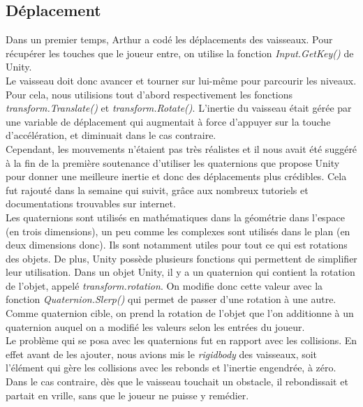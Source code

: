 \documentclass[12pt, titlepage]{article}
\begin{document}
\begin{spacing}{1.5}
\subsection{Déplacement}

Dans un premier temps, Arthur a codé les déplacements des vaisseaux. Pour récupérer les touches que le joueur entre, on utilise la fonction \textit{Input.GetKey()} de Unity.\\

Le vaisseau doit donc avancer et tourner sur lui-même pour parcourir les niveaux. Pour cela, nous utilisions tout d'abord respectivement les fonctions \textit{transform.Translate()} et \textit{transform.Rotate()}. L'inertie du vaisseau était gérée par une variable de déplacement qui augmentait à force d'appuyer sur la touche d'accélération, et diminuait dans le cas contraire.\\

Cependant, les mouvements n'étaient pas très réalistes et il nous avait été suggéré à la fin de la première soutenance d'utiliser les quaternions que propose Unity pour donner une meilleure inertie et donc des déplacements plus crédibles. Cela fut rajouté dans la semaine qui suivit, grâce aux nombreux tutoriels et documentations trouvables sur internet.\\

Les quaternions sont utilisés en mathématiques dans la géométrie dans l'espace (en trois dimensions), un peu comme les complexes sont utilisés dans le plan (en deux dimensions donc). Ils sont notamment utiles pour tout ce qui est rotations des objets. De plus, Unity possède plusieurs fonctions qui permettent de simplifier leur utilisation. Dans un objet Unity, il y a un quaternion qui contient la rotation de l'objet, appelé \textit{transform.rotation}. On modifie donc cette valeur avec la fonction \textit{Quaternion.Slerp()} qui permet de passer d'une rotation à une autre. Comme quaternion cible, on prend la rotation de l'objet que l'on additionne à un quaternion auquel on a modifié les valeurs selon les entrées du joueur.\\

Le problème qui se posa avec les quaternions fut en rapport avec les collisions. En effet avant de les ajouter, nous avions mis le \textit{rigidbody} des vaisseaux, soit l'élément qui gère les collisions avec les rebonds et l'inertie engendrée, à zéro. Dans le cas contraire, dès que le vaisseau touchait un obstacle, il rebondissait et partait en vrille, sans que le joueur ne puisse y remédier.\\


\end{spacing}
\end{document}

